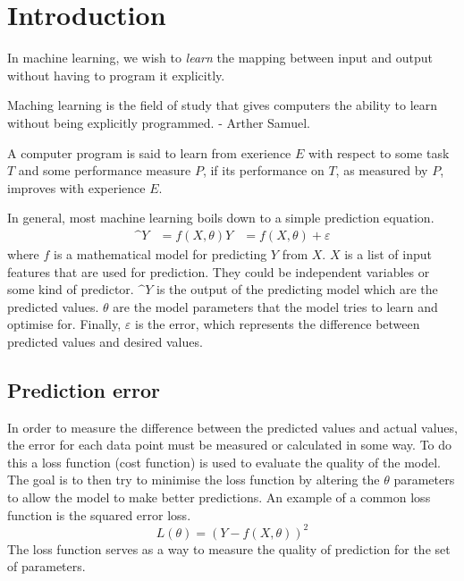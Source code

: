 \documentclass[CS5104-Notes.tex]{subfiles}
\begin{document}
\section{Introduction}
In machine learning, we wish to \textit{learn} the mapping between input and output without having to program it explicitly.

\begin{displayquote}
Maching learning is the field of study that gives computers the ability to learn without being explicitly programmed. - Arther Samuel.
\end{displayquote}

\begin{displayquote}
A computer program is said to learn from exerience $E$ with respect to some task $T$ and some performance measure $P$, if its performance on $T$, as measured by $P$, improves with experience $E$.
\end{displayquote}
\noindent
In general, most machine learning boils down to a simple prediction equation.
\begin{align}
  \^{Y} &= f(X, \theta)
  Y &= f(X, \theta) + \varepsilon
\end{align}
where $f$ is a mathematical model for predicting $Y$ from $X$. $X$ is a list of input features that are used for prediction. They could be independent variables or some kind of predictor. $\^{Y}$ is the output of the predicting model which are the predicted values. $\theta$ are the model parameters that the model tries to learn and optimise for. Finally, $\varepsilon$ is the error, which represents the difference between predicted values and desired values.

\subsection{Prediction error}
In order to measure the difference between the predicted values and actual values, the error for each data point must be measured or calculated in some way. To do this a loss function (cost function) is used to evaluate the quality of the model. The goal is to then try to minimise the loss function by altering the $\theta$ parameters to allow the model to make better predictions.
\n
An example of a common loss function is the squared error loss.
\begin{equation}
L(\theta) = (Y - f(X, \theta))^2
\end{equation}
The loss function serves as a way to measure the quality of prediction for the set of parameters.
\end{document}
